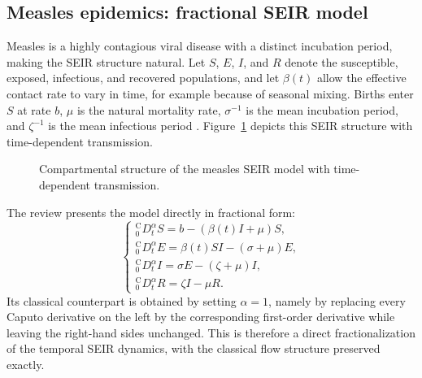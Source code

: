 \documentclass[00-main.tex]{subfiles}
\begin{document}
\subsection{Measles epidemics: fractional SEIR model}

Measles is a highly contagious viral disease with a distinct incubation period, making the SEIR structure natural.
Let $S$, $E$, $I$, and $R$ denote the susceptible, exposed, infectious, and recovered populations, and let $\beta(t)$ allow the effective contact rate to vary in time, for example because of seasonal mixing.
Births enter $S$ at rate $b$, $\mu$ is the natural mortality rate, $\sigma^{-1}$ is the mean incubation period, and $\zeta^{-1}$ is the mean infectious period \cite{Ch21,Goufo14}.
Figure~\ref{fig:measles-seir} depicts this SEIR structure with time-dependent transmission.

\begin{figure}[htbp]
\centering
{}
\caption{Compartmental structure of the measles SEIR model with time-dependent transmission.}
\label{fig:measles-seir}
\end{figure}

The review presents the model directly in fractional form:
\[
\begin{cases}
 {}_{0}^{\mathrm C}\!D_t^\alpha S=b-(\beta(t)I+\mu)S,\\[3pt]
 {}_{0}^{\mathrm C}\!D_t^\alpha E=\beta(t)SI-(\sigma+\mu)E,\\[3pt]
 {}_{0}^{\mathrm C}\!D_t^\alpha I=\sigma E-(\zeta+\mu)I,\\[3pt]
 {}_{0}^{\mathrm C}\!D_t^\alpha R=\zeta I-\mu R.
\end{cases}
\]
Its classical counterpart is obtained by setting $\alpha=1$, namely by replacing every Caputo derivative on the left by the corresponding first-order derivative while leaving the right-hand sides unchanged. This is therefore a direct fractionalization of the temporal SEIR dynamics, with the classical flow structure preserved exactly.
\end{document}
